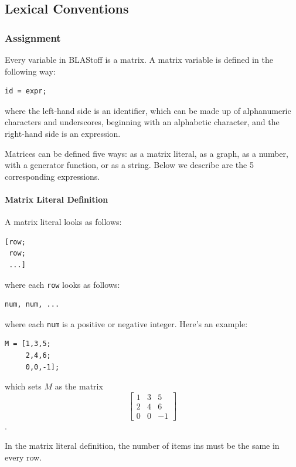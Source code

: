 
\subsection{Lexical Conventions}

\subsubsection{Assignment}
Every variable in BLAStoff is a matrix.  A matrix variable is defined in the following way:
\begin{lstlisting}
id = expr;
\end{lstlisting}
where the left-hand side is an identifier, which can be made up of alphanumeric characters and underscores, beginning with an alphabetic character, and the right-hand side is an expression.

Matrices can be defined five ways: as a matrix literal, as a graph, as a number, with a generator function, or as a string.  Below we describe are the 5 corresponding expressions.
\paragraph{Matrix Literal Definition}
A matrix literal looks as follows:

\begin{lstlisting}
[row;
 row;
 ...]
\end{lstlisting}
where each \verb=row= looks as follows:
\begin{lstlisting}
num, num, ...
\end{lstlisting}
where each \verb=num= is a positive or negative integer.  Here's an example:
\begin{lstlisting}
M = [1,3,5;
     2,4,6;
     0,0,-1];
\end{lstlisting}
which sets $M$ as the matrix $$\begin{bmatrix}1&3&5\\2&4&6\\0&0&-1\end{bmatrix}$$.

In the matrix literal definition, the number of items ins must be the same in every row.
